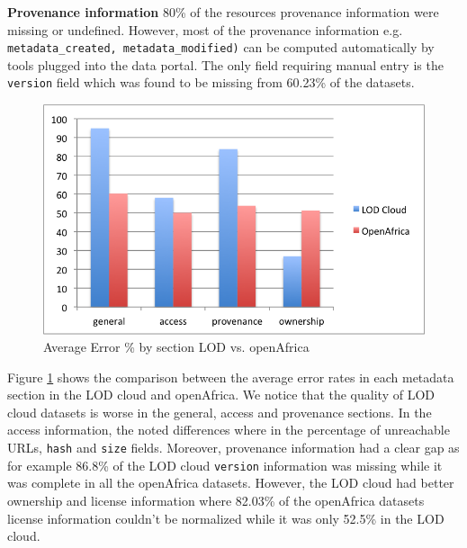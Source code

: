 \documentclass{../../Tools/LaTEX/sig-alternate}
\begin{document}
\textbf{Provenance information} 80\% of the resources provenance information were missing or undefined. However, most of the provenance information e.g. \texttt{metadata\_created, metadata\_modified)} can be computed automatically by tools plugged into the data portal. The only field requiring manual entry is the \texttt{version} field which was found to be missing from 60.23\% of the datasets.

\begin{figure}[!hpt]
\centering
\includegraphics[width=.8\linewidth]{metadata_LOD_vs_Africa.png}
\caption{Average Error \% by section LOD vs. openAfrica}
\label{fig:metadata_LOD_vs_Africa}
\end{figure}

Figure \ref{fig:metadata_LOD_vs_Africa} shows the comparison between the average error rates in each metadata section in the LOD cloud and openAfrica. We notice that the quality of LOD cloud datasets is worse in the general, access and provenance sections. In the access information, the noted differences where in the percentage of unreachable URLs, \texttt{hash} and \texttt{size} fields. Moreover, provenance information had a clear gap as for example 86.8\% of the LOD cloud \texttt{version} information was missing while it was complete in all the openAfrica datasets. However, the LOD cloud had better ownership and license information where 82.03\% of the openAfrica datasets license information couldn't be normalized while it was only 52.5\% in the LOD cloud.



\end{document}
